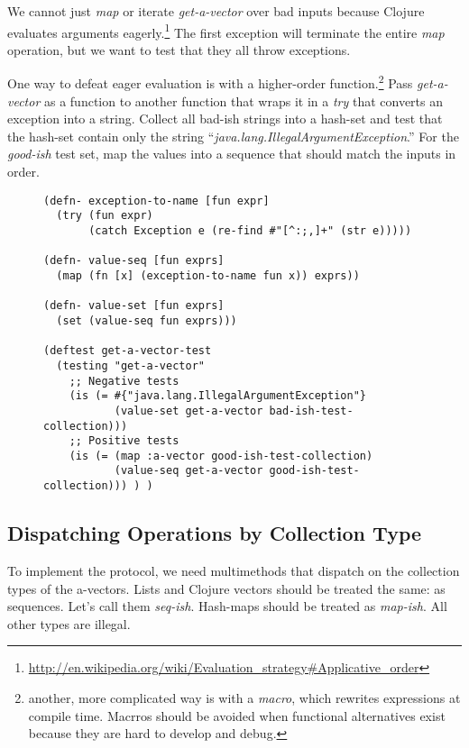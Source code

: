 \documentclass[11pt]{article}
\begin{document}
We cannot just \emph{map} or iterate \emph{get-a-vector} over bad inputs
because Clojure evaluates arguments
eagerly.\footnote{\url{http://en.wikipedia.org/wiki/Evaluation_strategy#Applicative_order}}
The first exception will terminate the entire \emph{map} operation, but we
want to test that they all throw exceptions.

One way to defeat eager evaluation is with a higher-order function.\footnote{another, more complicated way is with a \emph{macro}, which rewrites
   expressions at compile time. Macrros should be avoided when
   functional alternatives exist because they are hard to develop and
   debug.}  Pass \emph{get-a-vector} as a function to another function that
wraps it in a \emph{try} that converts an exception into a string.
Collect all bad-ish strings into a hash-set and test that the
hash-set contain only the string
``\emph{java.lang.IllegalArgumentException}.'' For the \emph{good-ish}
test set, map the values into a sequence that should match the inputs
in order.

\begin{figure}[H]
\label{get-a-vector-test}
\begin{verbatim}
(defn- exception-to-name [fun expr]
  (try (fun expr)
       (catch Exception e (re-find #"[^:;,]+" (str e)))))

(defn- value-seq [fun exprs]
  (map (fn [x] (exception-to-name fun x)) exprs))

(defn- value-set [fun exprs]
  (set (value-seq fun exprs)))

(deftest get-a-vector-test
  (testing "get-a-vector"
    ;; Negative tests
    (is (= #{"java.lang.IllegalArgumentException"}
           (value-set get-a-vector bad-ish-test-collection)))
    ;; Positive tests
    (is (= (map :a-vector good-ish-test-collection)
           (value-seq get-a-vector good-ish-test-collection))) ) )
\end{verbatim}
\end{figure}
\subsection{Dispatching Operations by Collection Type}
\label{sec-4-5}

To implement the protocol, we need multimethods that dispatch on the
collection types of the a-vectors. Lists and Clojure vectors should
be treated the same: as sequences. Let's call them
\emph{seq-ish}. Hash-maps should be treated as \emph{map-ish}. All other types
are illegal.
\end{document}
